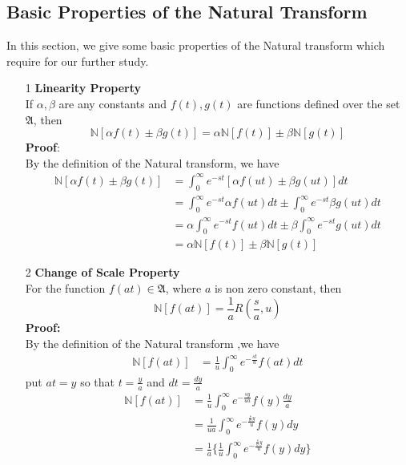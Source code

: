  \subsection{Basic Properties of the Natural Transform }
 In this section, we give some basic properties of the Natural transform which require for our further study.
 \begin{enumerate}
 \item[1] \textbf{Linearity Property}  \\
 If $ \alpha, \beta $ are any constants and $ f(t), g(t) $ are functions defined over the set $ \mathfrak{A} $, then
 \begin{equation}
 \mathbb{N}[\alpha f(t)\pm \beta g(t)]=\alpha\mathbb{N}[f(t)]\pm\beta\mathbb{N}[g(t)]
 \end{equation}
 \textbf{Proof}:\\
 By the definition of the Natural transform, we have
 \begin{align*}
 \mathbb{N}[\alpha f(t)\pm \beta g(t)]& = \int_{0}^{\infty}e^{-st}[\alpha f(ut)\pm \beta g(ut)]dt \\
 &=\int_{0}^{\infty}e^{-st}\alpha f(ut)dt\pm\int_{0}^{\infty}e^{-st}\beta g(ut)dt\\
 &=\alpha\int_{0}^{\infty}e^{-st}f(ut)dt\pm\beta\int_{0}^{\infty}e^{-st}g(ut)dt\\
 &=\alpha\mathbb{N}[f(t)]\pm\beta\mathbb{N}[g(t)]
 \end{align*}
 \item[2]\textbf{Change of Scale Property}\\
 For the function $f(at) \in \mathfrak{A}$, where $a$ is non zero constant, then
 \begin{equation}
 \mathbb{N}[f(at)]=\frac{1}{a}R(\frac{s}{a},u)
 \end{equation}
 \textbf{Proof:}\\
  By the definition of the Natural transform ,we have
 \begin{align*}
 \mathbb{N}[f(at)]& = \frac{1}{u}\int_{0}^{\infty}e^{-\frac{st}{u}}f(at)dt 
 \end{align*}
 put $ at=y $ so that $t=\frac{y}{a}$ and $dt=\frac{dy}{a} $
 \begin{align*}
 \mathbb{N}[f(at)]& = \frac{1}{u}\int_{0}^{\infty}e^{-\frac{sy}{ua}}f(y)\frac{dy}{a} \\
 & =\frac{1}{ua}\int_{0}^{\infty}e^{-\frac{\frac{s}{a}y}{u}}f(y)dy\\
  & =\frac{1}{a}\lbrace\frac{1}{u}\int_{0}^{\infty}e^{-\frac{\frac{s}{a}y}{u}}f(y)dy\rbrace\\

\end{align*}
\end{enumerate}
